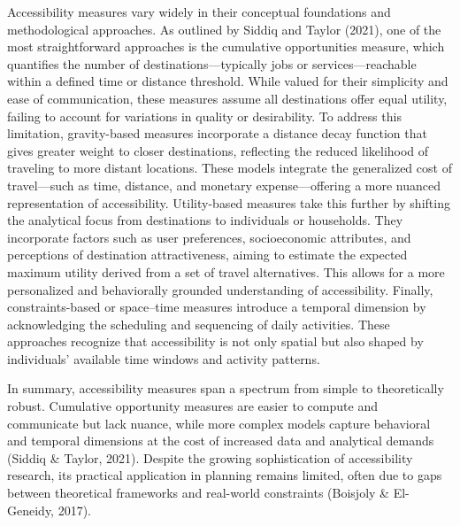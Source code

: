 \documentclass[
  12pt,
]{report}
\begin{document}
Accessibility measures vary widely in their conceptual foundations and
methodological approaches. As outlined by Siddiq and Taylor (2021), one
of the most straightforward approaches is the cumulative opportunities
measure, which quantifies the number of destinations---typically jobs or
services---reachable within a defined time or distance threshold. While
valued for their simplicity and ease of communication, these measures
assume all destinations offer equal utility, failing to account for
variations in quality or desirability. To address this limitation,
gravity-based measures incorporate a distance decay function that gives
greater weight to closer destinations, reflecting the reduced likelihood
of traveling to more distant locations. These models integrate the
generalized cost of travel---such as time, distance, and monetary
expense---offering a more nuanced representation of accessibility.
Utility-based measures take this further by shifting the analytical
focus from destinations to individuals or households. They incorporate
factors such as user preferences, socioeconomic attributes, and
perceptions of destination attractiveness, aiming to estimate the
expected maximum utility derived from a set of travel alternatives. This
allows for a more personalized and behaviorally grounded understanding
of accessibility. Finally, constraints-based or space--time measures
introduce a temporal dimension by acknowledging the scheduling and
sequencing of daily activities. These approaches recognize that
accessibility is not only spatial but also shaped by individuals'
available time windows and activity patterns.

In summary, accessibility measures span a spectrum from simple to
theoretically robust. Cumulative opportunity measures are easier to
compute and communicate but lack nuance, while more complex models
capture behavioral and temporal dimensions at the cost of increased data
and analytical demands (Siddiq \& Taylor, 2021). Despite the growing
sophistication of accessibility research, its practical application in
planning remains limited, often due to gaps between theoretical
frameworks and real-world constraints (Boisjoly \& El-Geneidy, 2017).
\end{document}
